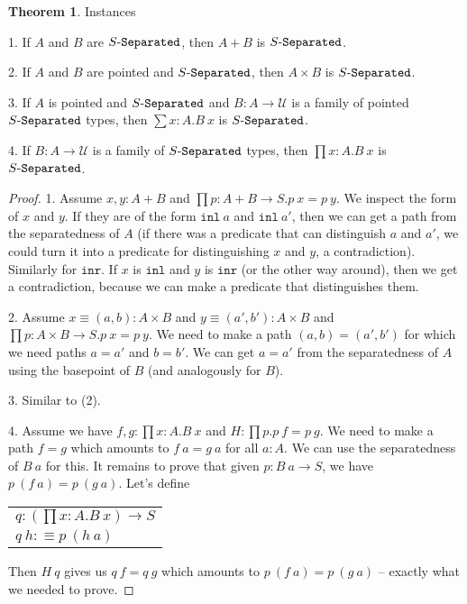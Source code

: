 \documentclass[11pt]{article}
\theoremstyle{definition}
\newtheorem{theorem}{Theorem}[section]
\newcommand{\txt}[1]{\texttt{#1}}
\renewcommand{\(}{\left(}
\renewcommand{\)}{\right)}
\newcommand{\defn}{:\equiv}
\newcommand{\U}{\mathcal{U}}
\newcommand{\apl}[2]{#1\ #2}
\newcommand{\dprod}[2]{\prod #1.#2}
\newcommand{\dsum}[2]{\sum #1.#2}
\newcommand{\prodt}[2]{#1 \times #2}
\newcommand{\inl}{\txt{inl}}
\newcommand{\inr}{\txt{inr}}
\begin{document}
\begin{theorem} Instances

1. If $A$ and $B$ are $\Separated{S}$, then $A + B$ is $\Separated{S}$.

2. If $A$ and $B$ are pointed and $\Separated{S}$, then $\prodt{A}{B}$ is $\Separated{S}$.

3. If $A$ is pointed and $\Separated{S}$ and $B : A \to \U$ is a family of pointed $\Separated{S}$ types, then $\dsum{x : A}{\apl{B}{x}}$ is $\Separated{S}$.

4. If $B : A \to \U$ is a family of $\Separated{S}$ types, then $\dprod{x : A}{\apl{B}{x}}$ is $\Separated{S}$.

\end{theorem}
\begin{proof}
1. Assume $x, y : A + B$ and $\dprod{p : A + B \to S}{\apl{p}{x} = \apl{p}{y}}$. We inspect the form of $x$ and $y$. If they are of the form $\apl{\inl}{a}$ and $\apl{\inl}{a'}$, then we can get a path from the separatedness of $A$ (if there was a predicate that can distinguish $a$ and $a'$, we could turn it into a predicate for distinguishing $x$ and $y$, a contradiction). Similarly for $\inr$. If $x$ is $\inl$ and $y$ is $\inr$ (or the other way around), then we get a contradiction, because we can make a predicate that distinguishes them.

2. Assume $x \equiv (a, b) : \prodt{A}{B}$ and $y \equiv (a', b') : \prodt{A}{B}$ and $\dprod{p : \prodt{A}{B} \to S}{\apl{p}{x} = \apl{p}{y}}$. We need to make a path $(a, b) = (a', b')$ for which we need paths $a = a'$ and $b = b'$. We can get $a = a'$ from the separatedness of $A$ using the basepoint of $B$ (and analogously for $B$).

3. Similar to (2).

4. Assume we have $f, g : \dprod{x : A}{\apl{B}{x}}$ and $H : \dprod{p}{\apl{p}{f} = \apl{p}{g}}$. We need to make a path $f = g$ which amounts to $\apl{f}{a} = \apl{g}{a}$ for all $a : A$. We can use the separatedness of $\apl{B}{a}$ for this. It remains to prove that given $p : \apl{B}{a} \to S$, we have $\apl{p}{(\apl{f}{a})} = \apl{p}{(\apl{g}{a})}$. Let's define \\

\begin{center}
\begin{tabular}{l}
$q : \(\dprod{x : A}{\apl{B}{x}}\) \to S$ \\
$\apl{q}{h} \defn \apl{p}{(\apl{h}{a})}$
\end{tabular}
\end{center}

Then $\apl{H}{q}$ gives us $\apl{q}{f} = \apl{q}{g}$ which amounts to $\apl{p}{(\apl{f}{a})} = \apl{p}{(\apl{g}{a})}$ -- exactly what we needed to prove.
\end{proof}
\end{document}

